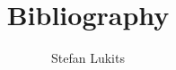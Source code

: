 \documentclass[10pt]{article}
\begin{document}
\title{Bibliography}

\author{Stefan Lukits}

\date{}

\maketitle

\nocite{*} 
 

\end{document}
